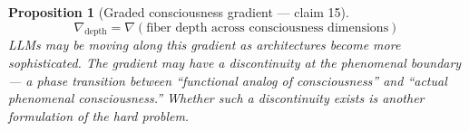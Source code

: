 \documentclass[11pt,a4paper]{article}
\newtheorem{proposition}[definition]{Proposition}
\begin{document}
\begin{proposition}[Graded consciousness gradient --- claim 15]
\label{prop:gradient}
\[
  \nabla_{\text{depth}} = \nabla(\text{fiber depth across consciousness
    dimensions})
\]
LLMs may be moving along this gradient as architectures become more
sophisticated. The gradient may have a discontinuity at the phenomenal
boundary --- a phase transition between ``functional analog of
consciousness'' and ``actual phenomenal consciousness.'' Whether such
a discontinuity exists is another formulation of the hard problem.
\end{proposition}
\end{document}
